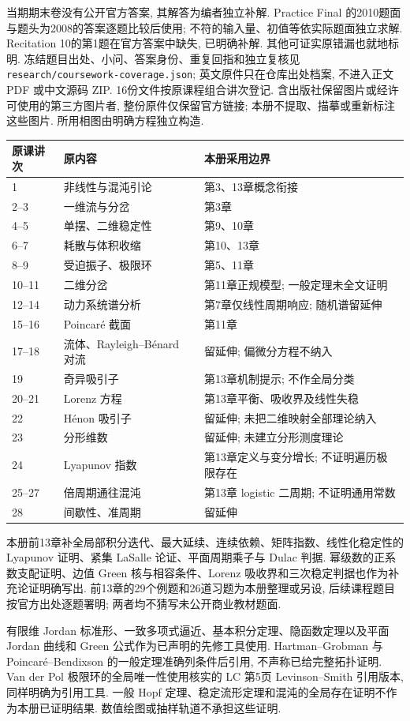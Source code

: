 当期期末卷没有公开官方答案, 其解答为编者独立补解. Practice Final 的2010题面与题头为2008的答案逐题比较后使用; 不符的输入量、初值等依实际题面独立求解. Recitation 10的第1题在官方答案中缺失, 已明确补解. 其他可证实原错漏也就地标明. 冻结题目出处、小问、答案身份、重复回指和独立复核见 \texttt{research/coursework-coverage.json}; 英文原件只在仓库出处档案, 不进入正文 PDF 或中文源码 ZIP.
16份文件按原课程组合讲次登记. 含出版社保留图片或经许可使用的第三方图片者, 整份原件仅保留官方链接; 本册不提取、描摹或重新标注这些图片. 所用相图由明确方程独立构造.
\begin{longtable}{p{}p{}p{}}
\toprule 原课讲次 & 原内容 & 本册采用边界 \\\midrule\endhead
1 & 非线性与混沌引论 & 第3、13章概念衔接 \\
2--3 & 一维流与分岔 & 第3章 \\
4--5 & 单摆、二维稳定性 & 第9、10章 \\
6--7 & 耗散与体积收缩 & 第10、13章 \\
8--9 & 受迫振子、极限环 & 第5、11章 \\
10--11 & 二维分岔 & 第11章正规模型; 一般定理未全文证明 \\
12--14 & 动力系统谱分析 & 第7章仅线性周期响应; 随机谱留延伸 \\
15--16 & Poincar\'e 截面 & 第11章 \\
17--18 & 流体、Rayleigh--B\'enard 对流 & 留延伸; 偏微分方程不纳入 \\
19 & 奇异吸引子 & 第13章机制提示; 不作全局分类 \\
20--21 & Lorenz 方程 & 第13章平衡、吸收界及线性失稳 \\
22 & H\'enon 吸引子 & 留延伸; 未把二维映射全部理论纳入 \\
23 & 分形维数 & 留延伸; 未建立分形测度理论 \\
24 & Lyapunov 指数 & 第13章定义与变分增长; 不证明遍历极限存在 \\
25--27 & 倍周期通往混沌 & 第13章 logistic 二周期; 不证明通用常数 \\
28 & 间歇性、准周期 & 留延伸 \\
\bottomrule
\end{longtable}
本册前13章补全局部积分迭代、最大延续、连续依赖、矩阵指数、线性化稳定性的 Lyapunov 证明、紧集 LaSalle 论证、平面周期乘子与 Dulac 判据. 幂级数的正系数支配证明、边值 Green 核与相容条件、Lorenz 吸收界和三次稳定判据也作为补充论证明确写出. 前13章的29个例题和26道习题为本册整理或另设, 后续课程题目按官方出处逐题署明; 两者均不猜写未公开商业教材题面.

有限维 Jordan 标准形、一致多项式逼近、基本积分定理、隐函数定理以及平面 Jordan 曲线和 Green 公式作为已声明的先修工具使用. Hartman--Grobman 与 Poincar\'e--Bendixson 的一般定理准确列条件后引用, 不声称已给完整拓扑证明. Van der Pol 极限环的全局唯一性使用核实的 LC 第5页 Levinson--Smith 引用版本, 同样明确为引用工具. 一般 Hopf 定理、稳定流形定理和混沌的全局存在证明不作为本册已证明结果. 数值绘图或抽样轨道不承担这些证明.
